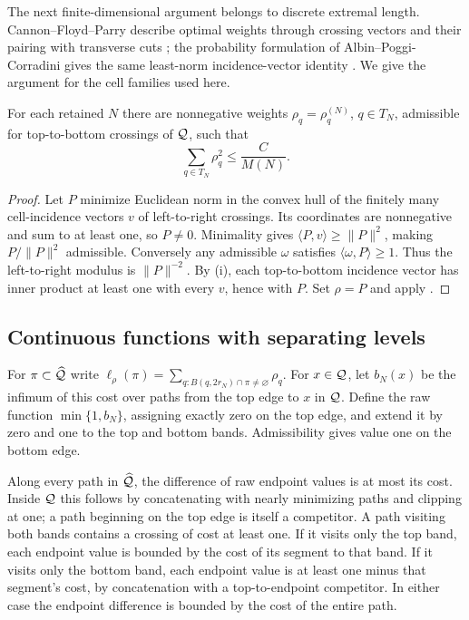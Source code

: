 The next finite-dimensional argument belongs to discrete extremal
length. Cannon--Floyd--Parry describe optimal weights through crossing
vectors and their pairing with transverse cuts
\cite[Sections 2.3 and 2.4.3]{CFPSquaring}; the probability formulation
of Albin--Poggi-Corradini gives the same least-norm incidence-vector
identity \cite[Theorem 5.1]{AlbinPoggiCorradini}. We give the argument
for the cell families used here.

\begin{lemma}
\label{lem:dual-weights}
For each retained $N$ there are nonnegative weights
$\rho_q=\rho_q^{(N)}$, $q\in T_N$, admissible for top-to-bottom
crossings of $\mathcal Q$, such that
\begin{equation}
 \sum_{q\in T_N}\rho_q^2\leq \frac{C}{M(N)}.
 \label{eq:dual-energy}
\end{equation}
\end{lemma}
\begin{proof}
Let $P$ minimize Euclidean norm in the convex hull of the finitely many
cell-incidence vectors $v$ of left-to-right crossings. Its coordinates
are nonnegative and sum to at least one, so $P\ne0$. Minimality gives
$\langle P,v\rangle\geq\|P\|^2$, making $P/\|P\|^2$ admissible.
Conversely any admissible $\omega$ satisfies
$\langle\omega,P\rangle\geq1$. Thus the left-to-right modulus is
$\|P\|^{-2}$. By (i), each top-to-bottom
incidence vector has inner product at least one with every $v$, hence
with $P$. Set $\rho=P$ and apply .
\end{proof}

\subsection{Continuous functions with separating levels}

For $\pi\subset\widehat{\mathcal Q}$ write
$\ell_\rho(\pi)=\sum_{q:B(q,2r_N)\cap\pi\ne\varnothing}\rho_q$.
For $x\in\mathcal Q$, let $b_N(x)$ be the infimum of this cost over paths
from the top edge to $x$ in $\mathcal Q$. Define the raw function
$\min\{1,b_N\}$, assigning exactly zero on the top edge, and extend
it by zero and one to the top and bottom bands. Admissibility gives
value one on the bottom edge.

Along every path in $\widehat{\mathcal Q}$, the difference of raw endpoint values is
at most its cost. Inside $\mathcal Q$ this follows by concatenating with
nearly minimizing paths and clipping at one; a path beginning on the
top edge is itself a competitor. A path visiting both bands contains
a crossing of cost at least one. If it visits only the top band, each
endpoint value is bounded by the cost of its segment to that band.
If it visits only the bottom band, each endpoint value is at least one
minus that segment's cost, by concatenation with a top-to-endpoint
competitor. In either case the endpoint difference is bounded by the
cost of the entire path.

